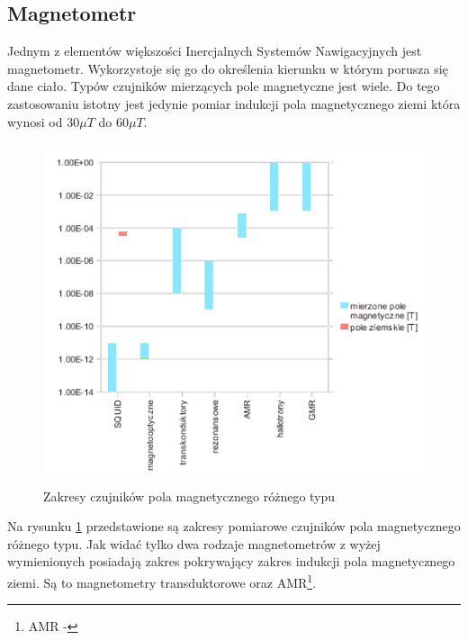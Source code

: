 \subsection{Magnetometr}
Jednym z elementów większości Inercjalnych Systemów Nawigacyjnych jest magnetometr. Wykorzystoje się go do określenia kierunku w którym porusza się dane ciało. Typów czujników mierzących pole magnetyczne jest wiele. Do tego zastosowaniu istotny jest jedynie pomiar indukcji pola magnetycznego ziemi która wynosi od $30\mu T$ do $60\mu T$.
\\

\begin{figure}[!ht]
 \centering
 \includegraphics[height=100mm]{../images/ch04/magnetic_sens_types.png}
 \caption{Zakresy czujników pola magnetycznego różnego typu \cite{WstepnyProjektModuluIMU}}
 \label{fig:WykresMagnet}
\end{figure}

Na rysunku \ref{fig:WykresMagnet} przedstawione są zakresy pomiarowe czujników pola magnetycznego różnego typu. Jak widać tylko dwa rodzaje magnetometrów z wyżej wymienionych posiadają zakres pokrywający zakres indukcji pola magnetycznego ziemi. Są to magnetometry transduktorowe oraz AMR\footnote{AMR - }.

